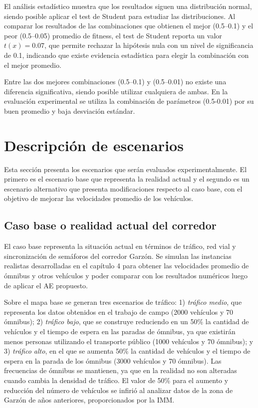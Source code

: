 El análisis estadístico muestra que los resultados siguen una distribución normal, siendo posible aplicar el test de Student para estudiar las distribuciones. Al comparar los resultados de las combinaciones que obtienen el mejor (0.5--0.1) y el peor (0.5--0.05) promedio de fitness, el test de Student reporta un valor $t(x)= 0.07$, que permite rechazar la hipótesis nula con un nivel de significancia de 0.1, indicando que existe evidencia estadística para elegir la combinación con el mejor promedio.

Entre las dos mejores combinaciones (0.5--0.1) y (0.5--0.01) no existe una diferencia significativa, siendo posible utilizar cualquiera de ambas. En la evaluación experimental se utiliza la combinación de parámetros (0.5-0.01) por su buen promedio y baja desviación estándar.


\section{Descripción de escenarios}
Esta sección presenta los escenarios que serán evaluados experimentalmente. El primero es el escenario base que representa la realidad actual y el segundo es un escenario alternativo que presenta modificaciones respecto al caso base, con el objetivo de mejorar las velocidades promedio de los vehículos.

\subsection{Caso base o realidad actual del corredor}
El caso base representa la situación actual en términos de tráfico, red vial y sincronización de semáforos del corredor Garzón. Se simulan las instancias realistas desarrolladas en el capítulo 4 para obtener las velocidades promedio de ómnibus y otros vehículos y poder comparar con los resultados numéricos luego de aplicar el AE propuesto.  

Sobre el mapa base se generan tres escenarios de tráfico: 1) \textit{tráfico medio}, que representa los datos obtenidos en el trabajo de campo (2000 vehículos y 70 ómnibus); 2) \textit{tráfico bajo}, que se construye reduciendo en un 50\% la cantidad de vehículos y el tiempo de espera en las paradas de ómnibus, ya que existirán menos personas utilizando el transporte público (1000 vehículos y 70 ómnibus); y 3)  \textit{tráfico alto}, en el que se aumenta 50\%  la cantidad de vehículos y el tiempo de espera en la parada de los ómnibus (3000 vehículos y 70 ómnibus). Las frecuencias de ómnibus se mantienen, ya que en la realidad no son alteradas cuando cambia la densidad de tráfico. El valor de 50\% para el aumento y reducción del número de vehículos se infirió al analizar datos de la zona de Garzón de años anteriores, proporcionados por la IMM.
 

